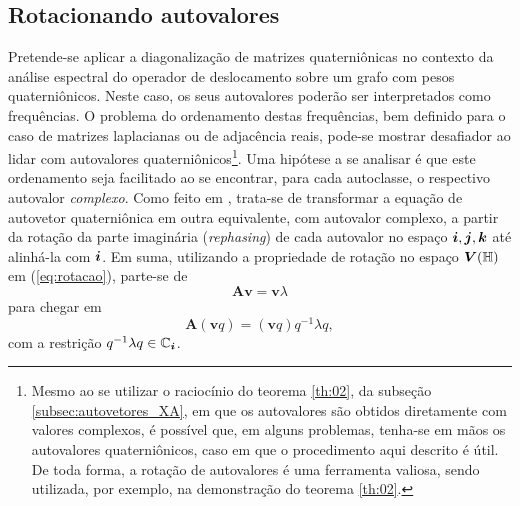 \subsection{Rotacionando autovalores}
\label{subsec:rotacionando}

Pretende-se aplicar a diagonaliza\c c\~ao de matrizes quaterni\^onicas no contexto da an\'alise espectral do operador de deslocamento sobre um grafo com pesos quaterni\^onicos. Neste caso, os seus autovalores poder\~ao ser interpretados como frequ\^encias. O problema do ordenamento destas frequ\^encias, bem definido para o caso de matrizes laplacianas ou de adjac\^encia reais, pode-se mostrar desafiador ao lidar com autovalores quaterni\^onicos\footnote{Mesmo ao se utilizar o racioc\'inio do teorema \ref{th:02}, da subse\c c\~ao \ref{subsec:autovetores_XA}, em que os autovalores s\~ao obtidos diretamente com valores complexos, \'e poss\'ivel que, em alguns problemas, tenha-se em m\~aos os autovalores quaterni\^onicos, caso em que o procedimento aqui descrito \'e \'util. De toda forma, a rota\c c\~ao de autovalores \'e uma ferramenta valiosa, sendo utilizada, por exemplo, na demonstra\c c\~ao do teorema \ref{th:02}.}.
Uma hip\'otese a se analisar \'e que este ordenamento seja facilitado ao se encontrar, para cada autoclasse, o respectivo autovalor \emph{complexo}. Como feito em \cite[Eq. (4.8)]{de2002quaternioic}, trata-se de transformar a equa\c c\~ao de autovetor quaterni\^onica em outra equivalente, com autovalor complexo, a partir da rota\c c\~ao da parte imagin\'aria (\emph{rephasing}) de cada autovalor no espa\c co $ \boldsymbol{i}, \boldsymbol{j}, \boldsymbol{k} $ at\'e alinh\'a-la com $ \boldsymbol{i} $. Em suma, utilizando a propriedade de rota\c c\~ao no espa\c co $ \boldsymbol{V} (\mathbb{H}) $ em (\ref{eq:rotacao}), parte-se de
\begin{equation}
\label{eq:01}
\mathbf{A} \mathbf{v} = \mathbf{v} \lambda
\end{equation}
para chegar em
\begin{equation}
\label{eq:02}
\mathbf{A} (\mathbf{v} q) = (\mathbf{v} q) q^{-1} \lambda q,
\end{equation}
com a restri\c c\~ao $ q^{-1} \lambda q \in \mathbb{C}_{\boldsymbol{i}} $.

